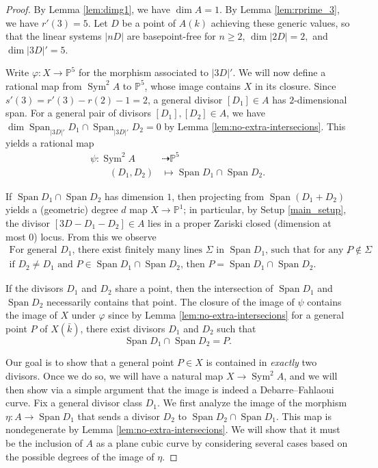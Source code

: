\documentclass[11pt]{amsart}
\newcommand{\pp}{\mathbb{P}}
\DeclareMathOperator{\Sym}{Sym}
\newcommand{\Span}{\operatorname{Span}}
\theoremstyle{definition}
\theoremstyle{remark}
\begin{document}
\begin{proof}
By  Lemma \ref{lem:dimg1}, we have \(\dim A = 1 \). By Lemma \ref{lem:rprime_3}, we have \(r'(3) = 5\). Let $D$ be a point of $A(k)$ achieving these generic values, so that the linear systems \(|nD|\) are basepoint-free for \(n \geqslant 2\), \(\dim |2D| = 2,\) and \(\dim |3D|' = 5\).  
    
    
    Write $\varphi \colon X \to \pp^5$ for the morphism associated to $|3D|'$. 
    We will now define a rational map
   from $\Sym^2 A$ to $\pp^5$, whose image contains $X$ in its closure. 
       Since $s'(3)=r'(3)-r(2)-1 = 2$, a general divisor  $[D_1] \in A$ has $2$-dimensional span.
   For a general pair of divisors $[D_1], [D_2] \in A$, we have $\dim \Span_{|3D|'} D_1 \cap \Span_{|3D|'} D_2 = 0$ by Lemma \ref{lem:no-extra-intersecions}.
This yields a rational map
    \begin{align*}
        \psi \colon \Sym^2A &\dashrightarrow \pp^5\\
        \qquad (D_1, D_2) & \mapsto \Span D_1  \cap \Span D_2.
    \end{align*}
    
 
If \(\Span D_1 \cap \Span D_2\) has dimension \(1\), then projecting from \(\Span(D_1 + D_2)\) yields a (geometric) degree \(d\) map \(X \to \pp^1\); in particular, by Setup \ref{main_setup}, the divisor \([3D - D_1 - D_2] \in A\) lies in a proper Zariski closed (dimension at most \(0\)) locus.  From this we observe 
\begin{multline} \label{positive-dim-intersections}
\text{For general \(D_1\), there exist finitely many lines \(\Sigma\) in \(\Span D_1\), such that for any \(P \not \in \Sigma\)},\\ \text{if \(D_2 \neq D_1\) and \(P \in \Span D_1 \cap \Span D_2\), then \(P = \Span D_1 \cap \Span D_2\).}
\end{multline}
        
    
    If the divisors \(D_1\) and \(D_2\) share a point, then the intersection of \(\Span D_1 \) and \(\Span D_2\) necessarily contains that point.  The closure of the image of \(\psi\) contains the image of \(X\) under \(\varphi\) since by Lemma \ref{lem:no-extra-intersecions} for a  general point \(P\) of \(X(\bar{k})\), there exist divisors \(D_1\) and \(D_2\) such that       
    \[ \Span D_1 \cap \Span D_2 = P.\]
    
    
    Our goal is to show that a general point $P \in X$ is contained in \emph{exactly} two divisors. Once we do so, we will have a natural map $X \to \Sym^2 A$, and we will then show via a simple argument that the image is indeed a Debarre--Fahlaoui curve. Fix a general divisor class $D_1$. We first analyze the image of the morphism $\eta: A \to \Span D_1$ that sends a divisor $D_2$ to $\Span D_2  \cap \Span D_1$. This map is 
    nondegenerate by Lemma \ref{lem:no-extra-intersecions}. 
 We will show that it must be the inclusion of \(A\) as a plane cubic curve by considering several cases based on the possible degrees of the image of \(\eta\).
\medskip


\end{proof}
\end{document}
